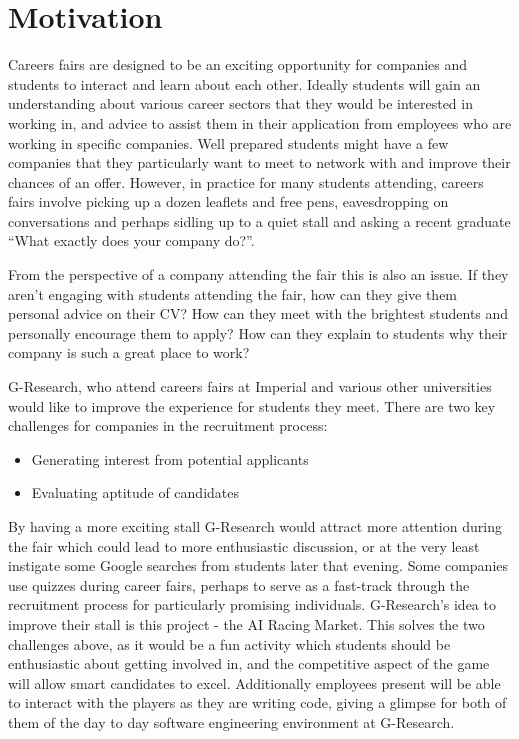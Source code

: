 \section{Motivation}
Careers fairs are designed to be an exciting opportunity for companies and students to interact and learn about each other. Ideally students will gain an understanding about various career sectors that they would be interested in working in, and advice to assist them in their application from employees who are working in specific companies. Well prepared students might have a few companies that they particularly want to meet to network with and improve their chances of an offer. However, in practice for many students attending, careers fairs involve picking up a dozen leaflets and free pens, eavesdropping on conversations and perhaps sidling up to a quiet stall and asking a recent graduate ``What exactly does your company do?''.

From the perspective of a company attending the fair this is also an issue. If they aren't engaging with students attending the fair, how can they give them personal advice on their CV? How can they meet with the brightest students and personally encourage them to apply? How can they explain to students why their company is such a great place to work?

G-Research, who attend careers fairs at Imperial and various other universities would like to improve the experience for students they meet.  There are two key challenges for companies in the recruitment process:
\begin{itemize}
	\item Generating interest from potential applicants
	\item Evaluating aptitude of candidates
\end{itemize}
By having a more exciting stall G-Research would attract more attention during the fair which could lead to more enthusiastic discussion, or at the very least instigate some Google searches from students later that evening. Some companies use quizzes during career fairs, perhaps to serve as a fast-track through the recruitment process for particularly promising individuals. G-Research's idea to improve their stall is this project - the AI Racing Market. This solves the two challenges above, as it would be a fun activity which students should be enthusiastic about getting involved in, and the competitive aspect of the game will allow smart candidates to excel. Additionally employees present will be able to interact with the players as they are writing code, giving a glimpse for both of them of the day to day software engineering environment at G-Research.
